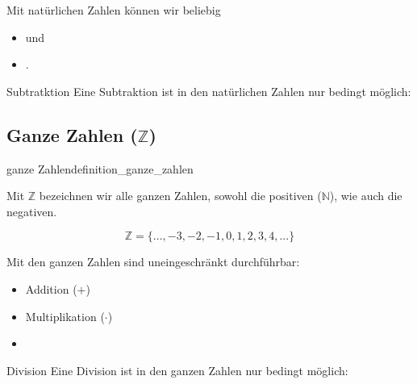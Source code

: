 

Mit natürlichen Zahlen können wir beliebig
\begin{itemize}
\item {}  und
\item {}.
\end{itemize}

\begin{bemerkung}{Subtratktion}{}
  Eine Subtraktion ist in den natürlichen Zahlen nur bedingt möglich:
\end{bemerkung}
\newpage


\subsection{Ganze Zahlen ($\mathbb{Z}$)}
\begin{definition}{ganze Zahlen}{definition_ganze_zahlen}

  Mit $\mathbb{Z}$ bezeichnen wir alle ganzen Zahlen, sowohl die
  positiven ($\mathbb{N}$), wie auch die negativen.
  \end{definition}

$$\mathbb{Z} = \{..., -3, -2, -1, 0, 1, 2, 3,  4, ... \}$$

Mit den ganzen Zahlen sind uneingeschränkt durchführbar:
\begin{itemize}
\item Addition ($+$)
  \item Multiplikation ($\cdot$)
\item {}
  \end{itemize}


\begin{bemerkung}{Division}{}
  Eine Division ist in den ganzen Zahlen nur bedingt möglich:
\end{bemerkung}


